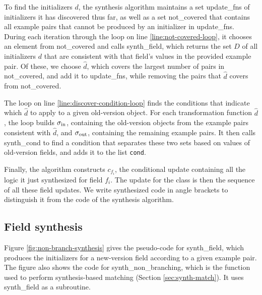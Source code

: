 \documentclass[natbib,10pt]{sigplanconf}
\newcommand{\code}[1]{\lstinline|#1|\xspace}
\begin{document}
To find the initializers $d$, the synthesis algorithm maintains a set \textsf{update\_fns} of
initializers it has discovered thus far, as well as
a set \textsf{not\_covered} that contains all example pairs that cannot
be produced by an initializer in \textsf{update\_fns}.  During each iteration
through the loop on line \ref{line:not-covered-loop}, it chooses an
element from \textsf{not\_covered} and calls \textsf{synth\_field},
which returns the set $D$ of all initializers $d$ that are
consistent with that field's values in the provided example pair.
Of these, we choose $\hat{d}$, which covers the largest number of
pairs in \textsf{not\_covered}, and add it to \textsf{update\_fns},
while removing the pairs that $\hat{d}$ covers from \textsf{not\_covered}.

The loop on line \ref{line:discover-condition-loop} finds the conditions that indicate which $\hat{d}$ to apply to a given old-version
object.
For each transformation function $\hat{d}$, the loop builds ${\sigma_{\text{in}}}$,
containing the old-version objects from the example pairs 
consistent with $\hat{d}$, and ${\sigma_{\text{out}}}$, containing the remaining example pairs.
It then calls \textsf{synth\_cond} to find a condition that separates these two
sets based on values of old-version fields, and adds it to the list \code{cond}.

Finally, the algorithm constructs $c_{f_i}$, the conditional update containing all the
logic it just synthesized for field $f_i$.  The update for the class is then
the sequence of all these field updates.  We write synthesized code in
angle brackets to distinguish it from the code of the synthesis
algorithm.

\subsection{Field synthesis}
\label{sec:field-synth}

Figure \ref{fig:non-branch-synthesis} gives the pseudo-code for
\textsf{synth\_field}, which produces the initializers for a
new-version field according to a given example pair.
The figure also shows the code for \textsf{synth\_non\_branching},
which is the function used to perform synthesis-based matching
(Section \ref{sec:synth-match}). It uses \textsf{synth\_field} as a
subroutine.
\end{document}
